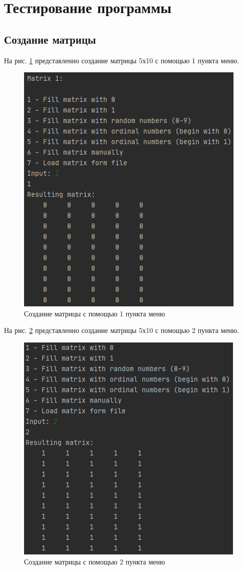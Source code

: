 \section*{Тестирование программы}

\subsection*{Создание матрицы}

На рис. \ref{matrix_creation1} представленно создание матрицы 5х10 с помощью 1 пункта меню.

\begin{figure}[hpt!]
	\centering
	\includegraphics[width=0.6\linewidth]{photo/matrix_creation1}
	\caption{Создание матрицы с помощью 1 пункта меню}
	\label{matrix_creation1}
\end{figure}

\newpage

На рис. \ref{matrix_creation2} представленно создание матрицы 5х10 с помощью 2 пункта меню.

\begin{figure}[hpt!]
	\centering
	\includegraphics[width=0.6\linewidth]{photo/matrix_creation2}
	\caption{Создание матрицы с помощью 2 пункта меню}
	\label{matrix_creation2}
\end{figure}

